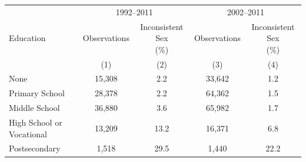 \begin{tabular}{lcccc}
\toprule
& \multicolumn{2}{c}{1992--2011} & \multicolumn{2}{c}{2002--2011} \\
\cmidrule(lr){2-3}\cmidrule(lr){4-5}
Education & Observations & \makecell{Inconsistent Sex\\(\%)} & Observations & \makecell{Inconsistent Sex\\(\%)} \\
  & (1) & (2) & (3) & (4)\\
\midrule
None & 15,308 & 2.2 & 33,642 & 1.2 \\
Primary School & 28,378 & 2.2 & 64,362 & 1.5 \\
Middle School & 36,880 & 3.6 & 65,982 & 1.7 \\
High School or Vocational & 13,209 & 13.2 & 16,371 & 6.8 \\
Postsecondary & 1,518 & 29.5 & 1,440 & 22.2 \\
\bottomrule
\end{tabular}

